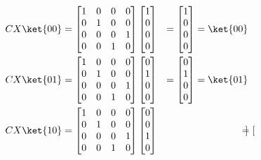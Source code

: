 \begin{equation}
  \begin{aligned}
    CX \ket{00} & = \begin{bmatrix}
      1 & 0 & 0 & 0 \\
      0 & 1 & 0 & 0 \\
      0 & 0 & 0 & 1 \\
      0 & 0 & 1 & 0
      \end{bmatrix} \begin{bmatrix}
      1 \\ 0 \\ 0 \\ 0
      \end{bmatrix} & = \begin{bmatrix}
      1 \\ 0 \\ 0 \\ 0
    \end{bmatrix} = \ket{00} \\
    CX \ket{01} & = \begin{bmatrix}
      1 & 0 & 0 & 0 \\
      0 & 1 & 0 & 0 \\
      0 & 0 & 0 & 1 \\
      0 & 0 & 1 & 0
      \end{bmatrix} \begin{bmatrix}
      0 \\ 1 \\ 0 \\ 0
      \end{bmatrix} & = \begin{bmatrix}
      0 \\ 1 \\ 0 \\ 0
    \end{bmatrix} = \ket{01} \\
    CX \ket{10} & = \begin{bmatrix}
      1 & 0 & 0 & 0 \\
      0 & 1 & 0 & 0 \\
      0 & 0 & 0 & 1 \\
      0 & 0 & 1 & 0
      \end{bmatrix} \begin{bmatrix}
      0 \\ 0 \\ 1 \\ 0
      \end{bmatrix} & = \begin{bmatrix}

\end{bmatrix}
\end{aligned}
\end{equation}
